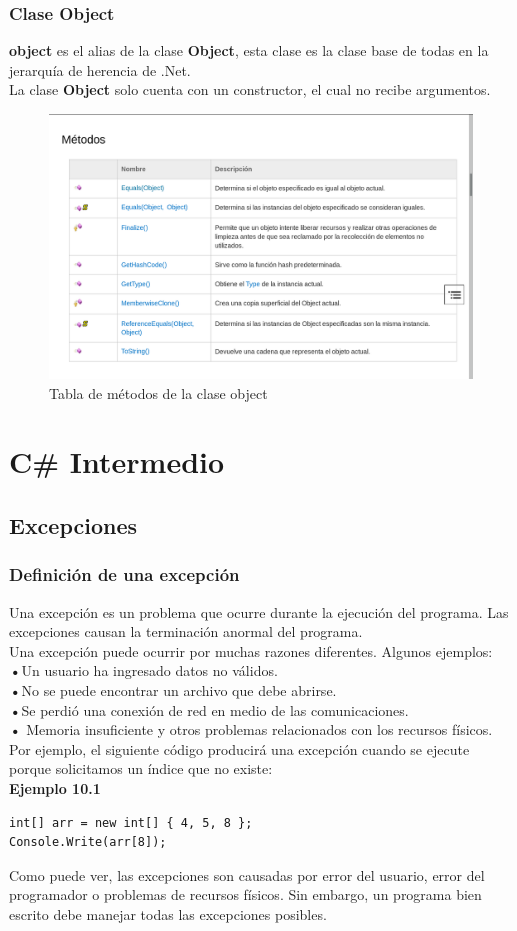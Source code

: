 \documentclass[12pt,a4paper]{report}
\begin{document}
\section{Clase Object}
\textbf{object} es el alias de la clase\textbf{ Object}, esta clase es la clase base de todas en la jerarquía de herencia de .Net.\\La clase\textbf{ Object} solo cuenta con un constructor, el cual no recibe argumentos.
\begin{figure}[hbtp]
\centering
\includegraphics[width=16cm]{Csh_Imagenes/Object.png}
\caption{Tabla de métodos de la clase object}
\end{figure}

\part{C\# Intermedio}

\chapter{Excepciones}
\section{Definición de una excepción}
Una excepción es un problema que ocurre durante la ejecución del programa. Las excepciones causan la terminación anormal del programa.\\Una excepción puede ocurrir por muchas razones diferentes. Algunos ejemplos:\\\textbf{•}Un usuario ha ingresado datos no válidos.\\\textbf{•}No se puede encontrar un archivo que debe abrirse.\\\textbf{•}Se perdió una conexión de red en medio de las comunicaciones.\\\textbf{•} Memoria insuficiente y otros problemas relacionados con los recursos físicos.\\Por ejemplo, el siguiente código producirá una excepción cuando se ejecute porque solicitamos un índice que no existe:\\\textbf{Ejemplo 10.1}
\begin{lstlisting}
int[] arr = new int[] { 4, 5, 8 };
Console.Write(arr[8]);
\end{lstlisting}Como puede ver, las excepciones son causadas por error del usuario, error del programador o problemas de recursos físicos. Sin embargo, un programa bien escrito debe manejar todas las excepciones posibles.
\end{document}
